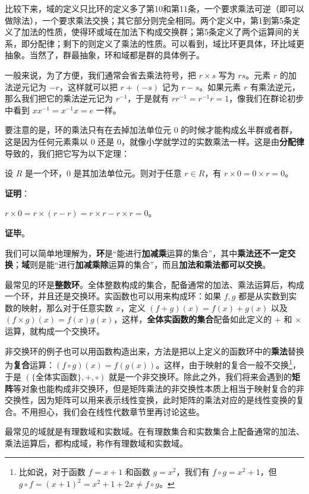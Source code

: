 比较下来，域的定义只比环的定义多了第10和第11条，一个要求乘法可逆（即可以做除法），一个要求乘法交换；其它部分则完全相同。两个定义中，第1到第5条定义了加法的性质，使得环或域在加法下构成交换群；第5条定义了两个运算间的关系，即分配律；剩下的则定义了乘法的性质。可以看到，域比环更具体，环比域更抽象。当然了，群最抽象，环和域都是群的具体例子。

一般来说，为了方便，我们通常会省去乘法符号，把 $r\times s$ 写为 $rs$。元素 $r$ 的加法逆元记为 $-r$，这样就可以把 $r+(-s)$ 记为 $r-s$。如果元素 $r$ 有乘法逆元，那么我们把它的乘法逆元记为 $r^{-1}$，于是就有 $rr^{-1}=r^{-1}r=1$，像我们在群论初步中看到 $xx^{-1}=x^{-1}x=e$ 一样。

要注意的是，环的乘法只有在去掉加法单位元 $0$ 的时候才能构成幺半群或者群，这是因为任何元素乘以 $0$ 还是 $0$，就像小学就学过的实数乘法一样。这是由\textbf{分配律}导致的，我们把它写为以下定理：

\begin{theorem}{}
设 $R$ 是一个环，$0$ 是其加法单位元。则对于任意 $r\in R$，有 $r\times 0=0\times r=0$。
\end{theorem}
\textbf{证明}：

$r\times 0=r\times (r-r)=r\times r-r\times r=0$。

\textbf{证毕}。



我们可以简单地理解为，\textbf{环}是“能进行\textbf{加减乘}运算的集合”，其中\textbf{乘法还不一定交换}；\textbf{域}则是能“进行\textbf{加减乘除}运算的集合”，而且\textbf{加法和乘法都可以交换}。

最常见的环是\textbf{整数环}。全体整数构成的集合，配备通常的加法、乘法运算后，构成一个环，并且还是交换环。实函数也可以用来构成环：如果 $f, g$ 都是从实数到实数的映射，那么对于任意实数 $x$，定义 $(f+g)(x)=f(x)+g(x)$ 以及 $(f\times g)(x)=f(x)g(x)$，这样，\textbf{全体实函数的集合}配备如此定义的 $+$ 和 $\times$ 运算，就构成一个交换环。

非交换环的例子也可以用函数构造出来，方法是把以上定义的函数环中的\textbf{乘法}替换为\textbf{复合}运算：$(f\circ g)(x)=f(g(x))$。这样，由于映射的复合一般不交换\footnote{比如说，对于函数 $f=x+1$ 和函数 $g=x^2$，我们有 $f\circ g=x^2+1$，但 $g\circ f=(x+1)^2=x^2+1+2x\not=f\circ g$。}，于是 $(\{\text{全体实函数}\}, +, \circ)$ 就是一个非交换环。除此之外，我们将来会遇到的\textbf{矩阵}等对象也能构成非交换环，但是矩阵乘法的非交换性本质上相当于映射复合的非交换性，因为矩阵可以用来表示线性变换，此时矩阵的乘法对应的是线性变换的复合。不用担心，我们会在线性代数章节里再讨论这些。

最常见的域就是有理数域和实数域。在有理数集合和实数集合上配备通常的加法、乘法运算后，都构成域，称作有理数域和实数域。

